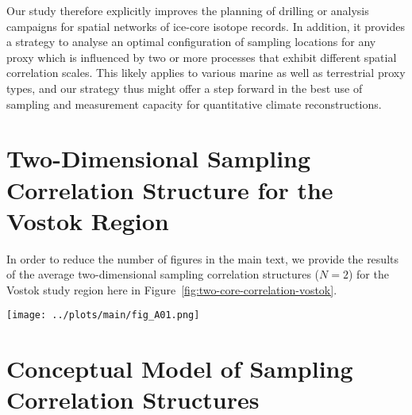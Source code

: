 \documentclass[draft]{agujournal2019}
\begin{document}
Our study therefore explicitly improves the planning of drilling or analysis
campaigns for spatial networks of ice-core isotope records. In addition, it
provides a strategy to analyse an optimal configuration of sampling locations
for any proxy which is influenced by two or more processes that exhibit
different spatial correlation scales. This likely applies to various marine as
well as terrestrial proxy types, and our strategy thus might offer a step
forward in the best use of sampling and measurement capacity for quantitative
climate reconstructions.

\appendix

\section{Two-Dimensional Sampling Correlation Structure for the Vostok Region}
\label{app:vostok.n2}

In order to reduce the number of figures in the main text, we provide the
results of the average two-dimensional sampling correlation structures ($N=2$)
for the Vostok study region here in Figure~\ref{fig:two-core-correlation-vostok}.

\begin{figure*}[t]%
\centering
\texttt{[image: ../plots/main/fig\_A01.png]}
\caption{%
  Sampling correlation structure with temperature in the two-dimensional case of
  sampling two locations in the Vostok region. Shown is the mean correlation of
  all possible single correlations for the average of two grid cells of
  (\textbf{a}) $T_{\mathrm{2m}}$, (\textbf{b}) $T_{\mathrm{2m}}^{\mathrm{(pw)}}$
  and (\textbf{c}) $\delta^{18}\mathrm{O}^{\mathrm{(pw)}}$ time series sampled
  from the same ring or from two different rings, averaged over all target sites
  in the given region. The axes display the distance from the target site, where
  the $x$ ($y$) axis represents for the first (second) sampled ring and the tick
  marks indicate the midpoint radii of the rings. Note that for
  $\delta^{18}\mathrm{O}^{\mathrm{(pw)}}$ the -- albeit marginal -- correlation
  maximum is achieved by combining the innermost ring with the ring between
  $500$--$750$\,km.}
\label{fig:two-core-correlation-vostok}%
\end{figure*}%

\section{Conceptual Model of Sampling Correlation Structures}
\label{app:concept.model}
\end{document}
